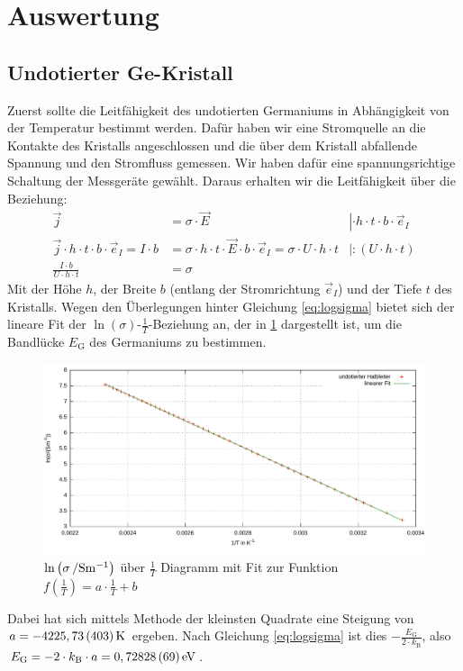 \documentclass[numbers=noenddot,14pt,a4paper]{scrartcl}
\newcommand{\ix}[1]{_\text{#1}}
\begin{document}
\section{Auswertung}
\subsection{Undotierter Ge-Kristall}
Zuerst sollte die Leitfähigkeit des undotierten Germaniums in Abhängigkeit von der Temperatur bestimmt werden. Dafür haben wir eine Stromquelle an die Kontakte des Kristalls angeschlossen und die über dem Kristall abfallende Spannung und den Stromfluss gemessen. Wir haben dafür eine spannungsrichtige Schaltung der Messgeräte gewählt. Daraus erhalten wir die Leitfähigkeit über die Beziehung:
\begin{align}
\vec{j}&=\sigma\cdot\vec{E}&\left|\cdot h\cdot t\cdot b\cdot \vec{e}_I\right.\nonumber\\
\vec{j}\cdot h\cdot t\cdot b\cdot\vec{e}_I=I\cdot b&=\sigma\cdot h\cdot t\cdot\vec{E}\cdot b\cdot \vec{e}_I=\sigma\cdot U\cdot h\cdot t &\left|:(U\cdot h\cdot t)\right.\\
\frac{I\cdot b}{U\cdot h\cdot t}&=\sigma
\end{align}
Mit der Höhe $h$, der Breite $b$ (entlang der Stromrichtung $\vec{e}_I$) und der Tiefe $t$ des Kristalls. Wegen den Überlegungen hinter Gleichung \ref{eq:logsigma} bietet sich der lineare Fit der $\ln\left(\sigma\right)$-$\frac{1}{T}$-Beziehung an, der in \ref{img:undlogsig} dargestellt ist, um die Bandlücke $E\ix{G}$ des Germaniums zu bestimmen.
\begin{figure}[H]
	\includegraphics[width=\textwidth]{messwerte/undotiert.pdf}
	\caption{$\ln\left(\unit[\sigma]{/Sm^{-1}} \right)$ über $\frac{1}{T}$ Diagramm mit Fit zur Funktion $f\left(\frac{1}{T}\right)=a\cdot\frac{1}{T}+b$} \label{img:undlogsig}
\end{figure}
Dabei hat sich mittels Methode der kleinsten Quadrate eine Steigung von $a=\unit[-4225,73\,(403)]{K}$ ergeben. Nach Gleichung \ref{eq:logsigma} ist dies $-\frac{E\ix{G}}{2\cdot k\ix{B}}$, also $E\ix{G}=-2\cdot k\ix{B}\cdot a=\unit[0,72828\,(69)]{eV}$.
\end{document}
